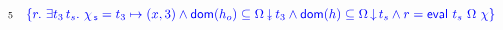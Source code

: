 {\[\begin{array}{l c}
  \num{5} & \hfill {\specK{\{ r\ldot\, \exists t_3\, t_s\ldot\,
    \histS = t_3 \hpts (x,3) \wedge
    \dom{h_o} \subseteq \sideal{\stableorder}{t_3} \wedge 
    \dom{h} \subseteq \ideal{\stableorder}{t_s} \wedge
    r = \eval\ t_s\ \stableorder\ \hist\}}} \hfill
\end{array}
\]}

